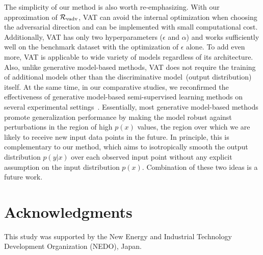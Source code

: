 \documentclass[10pt,journal,compsoc]{IEEEtran}
\newcommand\iwrite[1]{\textcolor{red}{Meada: #1}}
\begin{document}
The simplicity of our method is also worth re-emphasizing. With our approximation of $\mathcal{R}_{\rm vadv}$, VAT can avoid the internal optimization when choosing the adversarial direction and can be implemented with small computational cost. 
Additionally, VAT has only two hyperparameters ($\epsilon$ and $\alpha$) and works sufficiently well on the benchmark dataset with the optimization of $\epsilon$ alone.  
To add even more, VAT is applicable to wide variety of models regardless of its architecture. Also, unlike generative model-based methods, VAT does not require the training of additional models other than the discriminative model~(output distribution) itself.  
At the same time, in our comparative studies, we reconfirmed the effectiveness of generative model-based semi-supervised learning methods on several experimental settings~\cite{kingma2014semi, springenberg2015unsupervised, salimans2016improved}.
Essentially, most generative model-based methods promote generalization performance by making the model robust against perturbations in the region of high $p(x)$ values, the region over which we are likely to receive new input data points in the future. 
In principle, this is complementary to our method, which aims to isotropically smooth the output distribution $p(y|x)$ over each observed input point without any explicit assumption on the input distribution $p(x)$. Combination of these two ideas is a future work.

\section*{Acknowledgments}
This study was supported by the New Energy and Industrial Technology Development Organization (NEDO), Japan.




\end{document}
